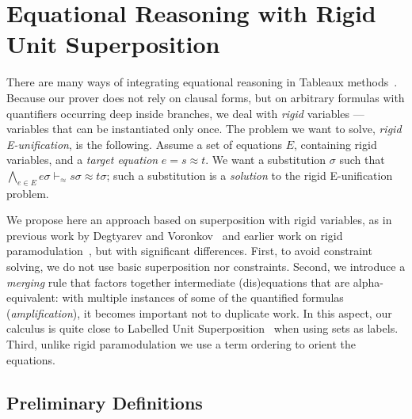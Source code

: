 
\section{Equational Reasoning with Rigid Unit Superposition}
\label{sec:rusuper}

\EnableBpAbbreviations{}

\newcommand\clauseWithSubst[2]{\ensuremath{#1 ~|~ #2}}
\newcommand\renameVarsSymb{\ensuremath{\textsf{rename}}}
\newcommand\renameVars[1]{\ensuremath{\renameVarsSymb}(#1)}
\newcommand\mapVar[2]{\ensuremath{#2/#1}}

There are many ways of integrating equational reasoning in
Tableaux methods~\cite{brand1975proving,letz2002integration,backeman2015theorem,degtyarev1996you}.
Because our prover does not rely on clausal forms, but on arbitrary formulas
with quantifiers occurring deep inside branches,
we deal with {\em rigid} variables --- variables that can be instantiated
only once.
The problem we want to solve, {\em rigid E-unification}, is the following.
Assume a set of equations $E$, containing rigid variables,
and a {\em target equation} $e = s \approx t$.
We want a substitution $\sigma$ such that
$\bigwedge_{e \in E} e\sigma \vdash_\approx s\sigma \approx t\sigma$;
such a substitution is a {\em solution} to the rigid E-unification problem.

We propose here an approach based on superposition with rigid variables,
as in previous work by Degtyarev and Voronkov~\cite{degtyarev1996you}
and earlier work on rigid paramodulation~\cite{plaisted1995special},
but with significant differences.
First, to avoid constraint solving, we do not use
basic superposition nor constraints.
Second, we introduce a {\em merging} rule that factors together
intermediate (dis)equations that are alpha-equivalent:
with multiple instances of some of the quantified formulas ({\em amplification}),
it becomes important not to duplicate work.
In this aspect, our calculus is quite close to Labelled
Unit Superposition~\cite{iprover_eq_labelled_unit_sup} when using sets as labels.
Third, unlike rigid paramodulation we use a term ordering to orient the
equations.

\subsection{Preliminary Definitions}


